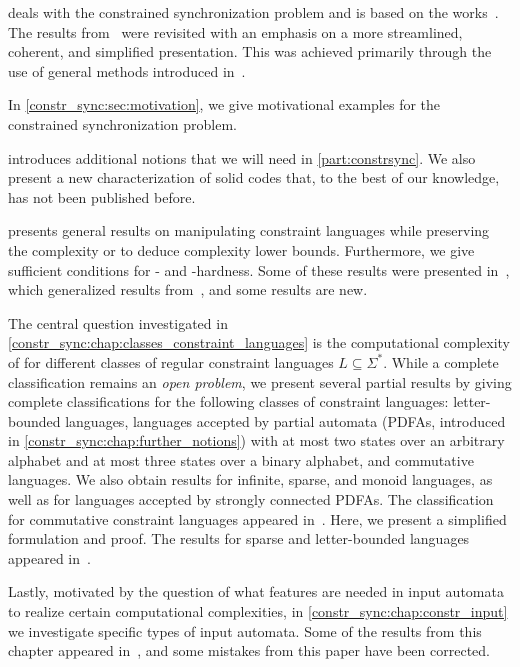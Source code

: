  deals with the constrained synchronization problem and is based on the works~\cite{FernauGHHVW19,
	DBLP:conf/cocoon/Hoffmann20,
	DBLP:conf/ictcs/Hoffman20,
	DBLP:conf/fct/Hoffmann21,
	DBLP:journals/tcs/Hoffmann21,
	DBLP:conf/cocoon/Hoffmann21,
	DBLP:conf/wia/Hoffmann22,
	HoffmannCocoonExtended}.
The results from~\cite{DBLP:conf/cocoon/Hoffmann20,DBLP:conf/fct/Hoffmann21,DBLP:journals/tcs/Hoffmann21,DBLP:conf/cocoon/Hoffmann21,HoffmannCocoonExtended}
were revisited with an emphasis on a more streamlined, coherent, and simplified presentation.
This was achieved primarily through the use of general methods introduced in~\cite{DBLP:conf/cocoon/Hoffmann21,HoffmannCocoonExtended}.

In \cref{constr_sync:sec:motivation}, we give motivational examples for the constrained synchronization problem.

 introduces additional notions that we will need in \cref{part:constrsync}. We also present a new characterization of solid codes that, to the best of our knowledge, has not been published before.

 presents general results on manipulating constraint languages while preserving
the complexity or to deduce complexity lower bounds. Furthermore, we give sufficient conditions for \NP- and \PSPACE-hardness. 
Some of these results
were presented in~\cite{DBLP:conf/cocoon/Hoffmann21,HoffmannCocoonExtended},
which generalized results from~\cite{FernauGHHVW19},
and some results are new.

The central question investigated in \cref{constr_sync:chap:classes_constraint_languages}
is the computational complexity of  for different classes of regular
constraint languages $L \subseteq \Sigma^*$.
While a complete classification remains an \emph{open problem},
we present several partial results by giving complete classifications for the following classes of constraint languages:
letter-bounded languages, languages accepted by partial automata (PDFAs, introduced in
\cref{constr_sync:chap:further_notions}) with at most two states over an arbitrary alphabet and at most three states over a binary alphabet, and commutative languages.
We also obtain results for infinite, sparse, and monoid languages, as well as
for languages accepted by strongly connected PDFAs.
The classification for commutative constraint languages appeared
in~\cite{DBLP:conf/cocoon/Hoffmann20,DBLP:journals/tcs/Hoffmann21}.
Here, we present a simplified formulation and proof.
The results for sparse and letter-bounded languages appeared
in~\cite{DBLP:conf/ictcs/Hoffman20,DBLP:conf/fct/Hoffmann21}.

Lastly, motivated by the question of what features are needed in input automata to realize certain computational complexities, in \cref{constr_sync:chap:constr_input} we investigate specific types of input automata. Some of the results from this chapter appeared in~\cite{DBLP:conf/wia/Hoffmann22}, and some mistakes from this paper have been corrected.